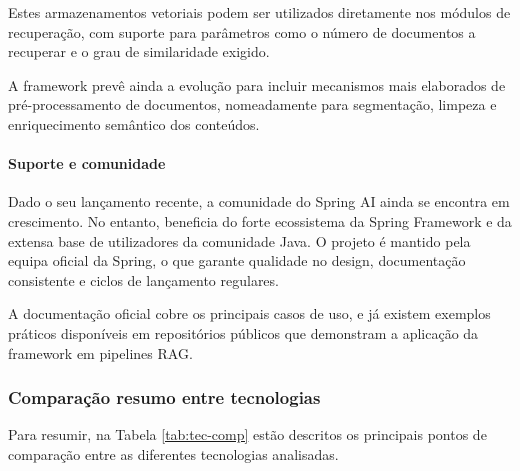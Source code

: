 Estes armazenamentos vetoriais podem ser utilizados diretamente nos módulos de recuperação, com suporte para parâmetros como o número de documentos a recuperar e o grau de similaridade exigido.

A framework prevê ainda a evolução para incluir mecanismos mais elaborados de pré-processamento de documentos, nomeadamente para segmentação, limpeza e enriquecimento semântico dos conteúdos.

\paragraph{Suporte e comunidade}

Dado o seu lançamento recente, a comunidade do Spring AI ainda se encontra em crescimento. No entanto, beneficia do forte ecossistema da Spring Framework e da extensa base de utilizadores da comunidade Java. O projeto é mantido pela equipa oficial da Spring, o que garante qualidade no design, documentação consistente e ciclos de lançamento regulares.

A documentação oficial cobre os principais casos de uso, e já existem exemplos práticos disponíveis em repositórios públicos que demonstram a aplicação da framework em pipelines RAG.


\subsubsection{Comparação resumo entre tecnologias}


Para resumir, na Tabela \ref{tab:tec-comp} estão descritos os principais pontos de comparação entre as diferentes tecnologias analisadas. 

